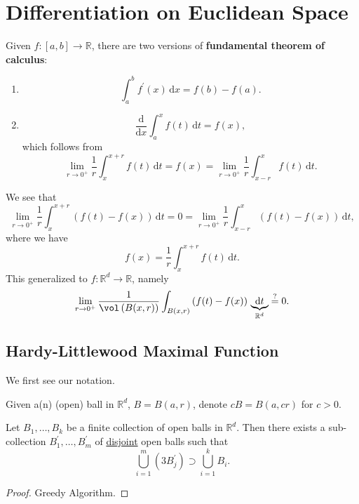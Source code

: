 \chapter{Differentiation on Euclidean Space}\label{ch:Differentiation-on-Euclidean-Space}
\begin{prev}
	Given \(f\colon [a, b]\to \mathbb{R} \), there are two versions of \textbf{fundamental theorem of calculus}:
	\begin{enumerate}[(1)]
		\item
		      \[
			      \int_{a}^{b} f^\prime (x) \,\mathrm{d}x = f(b) - f(a).
		      \]
		\item
		      \[
			      \frac{\mathrm{d}}{\mathrm{d}x} \int_{a}^{x} f(t) \,\mathrm{d}t = f(x),
		      \]
		      which follows from
		      \[
			      \lim_{r \to 0^+} \frac{1}{r}\int_{x}^{x+r} f(t) \,\mathrm{d}t = f(x) = \lim_{r \to 0^+} \frac{1}{r}\int_{x-r}^{x} f(t) \,\mathrm{d}t.
		      \]
	\end{enumerate}
\end{prev}
\begin{remark}
	We see that
	\[
		\lim_{r \to 0^+} \frac{1}{r}\int_{x}^{x+r} \left(f(t)-f(x)\right) \,\mathrm{d}t = 0 = \lim_{r \to 0^+} \frac{1}{r}\int_{x-r}^{x} \left(f(t)-f(x)\right) \,\mathrm{d}t,
	\]
	where we have
	\[
		f(x) = \frac{1}{r}\int_{x}^{x+r} f(t) \,\mathrm{d}t.
	\]
	This generalized to \(f\colon \mathbb{R} ^d\to \mathbb{R} \), namely
	\[
		\lim_{r \to 0^+} \frac{1}{\vol \left(B(x, r)\right)}\int_{B(x, r)}\left(f(t)-f(x)\right)\,\underbrace{\mathrm{d}t}_{\mathbb{R} ^d} \overset{?}{=} 0.
	\]
\end{remark}
\section{Hardy-Littlewood Maximal Function}
We first see our notation.
\begin{notation}
	Given a(n) (open) ball in \(\mathbb{R} ^d\), \(B = B(a, r)\), denote \(cB = B(a, cr)\) for \(c>0\).
\end{notation}

\begin{lemma}\label{lma:Vitali-type-covering-lemma}
	Let \(B_1, \dots , B_k \) be a finite collection of open balls in \(\mathbb{R} ^d\). Then there
	exists a sub-collection \(B^\prime _1, \dots , B^\prime _m \) of \underline{disjoint} open balls such that
	\[
		\bigcup_{i=1}^{m} \left(3 B_{j} ^\prime \right)\supset \bigcup_{i=1}^{k} B_{i}.
	\]
\end{lemma}
\begin{proof}
	Greedy Algorithm.
\end{proof}
